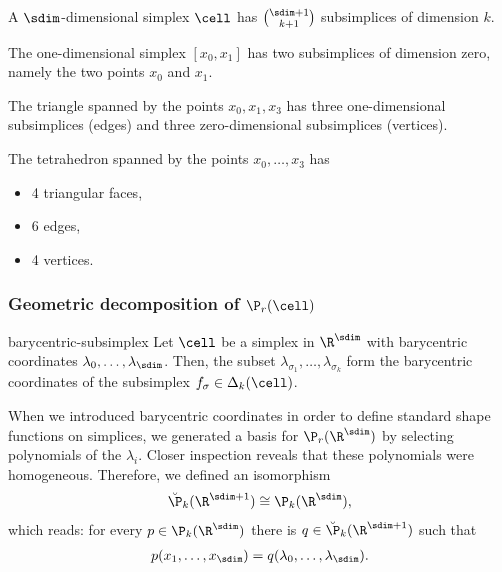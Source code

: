 \begin{example}
  A $\sdim$-dimensional simplex $\cell$ has $\binom{\sdim+1}{k+1}$
  subsimplices of dimension $k$.

  The one-dimensional simplex $[x_0,x_1]$ has two subsimplices of
  dimension zero, namely the two points $x_0$ and $x_1$.

  The triangle spanned by the points $x_0, x_1, x_3$ has three
  one-dimensional subsimplices (edges) and three zero-dimensional
  subsimplices (vertices).

  The tetrahedron spanned by the points $x_0,\dots,x_3$ has
  \begin{itemize}
  \item 4 triangular faces,
  \item 6 edges,
  \item 4 vertices.
  \end{itemize}
\end{example}

\subsubsection{Geometric decomposition of $\P_r(\cell)$}

\begin{Lemma}{barycentric-subsimplex}
  Let $\cell$ be a simplex in $\R^\sdim$ with barycentric coordinates
  $\lambda_0,\dots,\lambda_\sdim$. Then, the subset
  $\lambda_{\sigma_1},\dots,\lambda_{\sigma_k}$ form the barycentric
  coordinates of the subsimplex $f_\sigma\in\Delta_k(\cell)$.
\end{Lemma}

\begin{remark}
  When we introduced barycentric coordinates in order to define
  standard shape functions on simplices, we generated a basis for
  $\P_r(\R^\sdim)$ by selecting polynomials of the $\lambda_i$. Closer
  inspection reveals that these polynomials were
  homogeneous. Therefore, we defined an isomorphism
  \begin{gather}
    \breve \P_k(\R^{\sdim+1}) \cong \P_k(\R^\sdim),
  \end{gather}
  which reads: for every $p\in \P_k(\R^\sdim)$ there is
  $q\in\breve\P_k(\R^{\sdim+1})$ such that
  \begin{gather}
    p(x_1,\dots,x_\sdim) = q(\lambda_0,\dots,\lambda_\sdim).
  \end{gather}
\end{remark}

